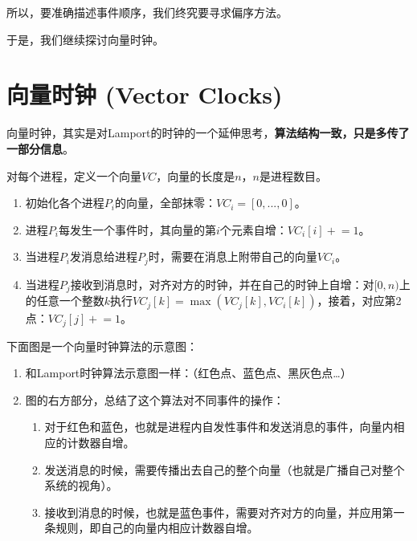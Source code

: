 \documentclass[cn,11pt,chinese]{elegantbook}
\providecommand{\tightlist}{%
  \setlength{\itemsep}{0pt}\setlength{\parskip}{0pt}}
\begin{document}
所以，要准确描述事件顺序，我们终究要寻求偏序方法。

于是，我们继续探讨向量时钟。

\hypertarget{ux5411ux91cfux65f6ux949f-vector-clocks}{%
\section{向量时钟 (Vector
Clocks)}\label{ux5411ux91cfux65f6ux949f-vector-clocks}}

向量时钟，其实是对Lamport的时钟的一个延伸思考，\textbf{算法结构一致，只是多传了一部分信息}。

对每个进程，定义一个向量\(VC\)，向量的长度是\(n\)，\(n\)是进程数目。

\begin{enumerate}
\def\labelenumi{\arabic{enumi}.}
\tightlist
\item
  初始化各个进程\(P_i\)的向量，全部抹零：\(VC_i = [0,...,0]\)。
\item
  进程\(P_i\)每发生一个事件时，其向量的第\(i\)个元素自增：\(VC_i[i] \mathrel{+}= 1\)。
\item
  当进程\(P_i\)发消息给进程\(P_j\)时，需要在消息上附带自己的向量\(VC_i\)。
\item
  当进程\(P_j\)接收到消息时，对齐对方的时钟，并在自己的时钟上自增：对\([0,n)\)上的任意一个整数\(k\)执行\(VC_j[k] = \max (VC_j[k],VC_i[k])\)，接着，对应第2点：\(VC_j[j] \mathrel{+}= 1\)。
\end{enumerate}

下面图是一个向量时钟算法的示意图：

\begin{enumerate}
\def\labelenumi{\arabic{enumi}.}
\tightlist
\item
  和Lamport时钟算法示意图一样：（红色点、蓝色点、黑灰色点\ldots）
\item
  图的右方部分，总结了这个算法对不同事件的操作：

  \begin{enumerate}
  \def\labelenumii{\arabic{enumii}.}
  \tightlist
  \item
    对于红色和蓝色，也就是进程内自发性事件和发送消息的事件，向量内相应的计数器自增。
  \item
    发送消息的时候，需要传播出去自己的整个向量（也就是广播自己对整个系统的视角）。
  \item
    接收到消息的时候，也就是蓝色事件，需要对齐对方的向量，并应用第一条规则，即自己的向量内相应计数器自增。
  \end{enumerate}
\end{enumerate}
\end{document}
